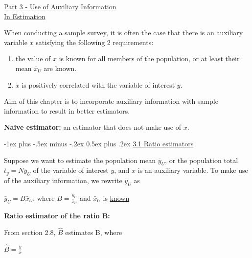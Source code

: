 \documentclass[10pt,landscape]{article}
\makeatletter
\renewcommand{\section}{\@startsection{section}{1}{0mm}%
                                {-1ex plus -.5ex minus -.2ex}%
                                {0.5ex plus .2ex}%
                                {\normalfont\large\bfseries}}
\makeatother
\begin{document}
\raggedright
\footnotesize
\begin{multicols}{3}


\setlength{\premulticols}{1pt}
\setlength{\postmulticols}{1pt}
\setlength{\multicolsep}{1pt}
\setlength{\columnsep}{2pt}

\begin{center}
     \Large{\underline{Part 3 - Use of Auxiliary Information}} \\
     \Large{\underline{In Estimation}}
\end{center}

When conducting a sample survey, it is often the case that there is an auxiliary variable $x$ satisfying the following 2 requirements:
\begin{enumerate}
  \item the value of $x$ is known for all members of the population, or at least their mean $\bar{x}_{U}$ are known.
  \item $x$ is positively correlated with the variable of interest $y$.
\end{enumerate}

Aim of this chapter is to incorporate auxiliary information with sample information to result in better estimators.

\vspace{5}

\textbf{Naive estimator:} an estimator that does not make use of $x$.

\vspace{10}

\section{\underline{3.1 Ratio estimators}}

Suppose we want to estimate the population mean $\bar{y}_{U}$, or the population total $t_{y} = N\bar{y}_{U}$ of the variable of interest $y$, and $x$ is an auxiliary variable. To make use of the auxiliary information, we rewrite $\bar{y}_{U}$ as

\begin{center}
  $\bar{y}_{U} = B\bar{x}_{U}$, where $B = \frac{\bar{y}_{U}}{\bar{x}_{U}}$ and $\bar{x}_{U}$ is \underline{known}
\end{center}

\textbf{Ratio estimator of the ratio B:}

From section 2.8, $\hat{B}$ estimates B, where
\begin{center}
  $\hat{B} = \frac{\bar{y}}{\bar{x}}$
\end{center}


\end{multicols}
\end{document}
